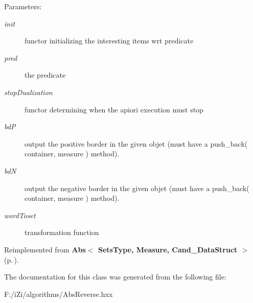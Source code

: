 \begin{Desc}
\item[Parameters:]
\begin{description}
\item[{\em init}]functor initializing the interesting items wrt predicate \item[{\em pred}]the predicate \item[{\em stop\-Dualization}]functor determining when the apiori execution must stop \item[{\em bd\-P}]output the positive border in the given objet (must have a push\_\-back( container, measure ) method). \item[{\em bd\-N}]output the negative border in the given objet (must have a push\_\-back( container, measure ) method). \item[{\em word\-Toset}]transformation function \end{description}
\end{Desc}


Reimplemented from {\bf Abs$<$ Sets\-Type, Measure, Cand\_\-Data\-Struct $>$} {\rm (p.\,\pageref{class_abs_991fe73b7db6f50b75e434631187ec9a})}.

The documentation for this class was generated from the following file:\begin{CompactItemize}
\item 
F:/i\-Zi/algorithms/Abs\-Reverse.hxx\end{CompactItemize}
